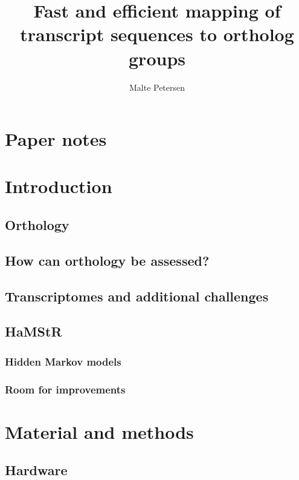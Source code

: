 \documentclass[a4paper,12.5pt]{scrreprt}
\title{Fast and efficient mapping of transcript sequences to ortholog groups}
\author{Malte Petersen}
\newcommand{\hamstr}{HaMStR\xspace}
\begin{document}
\maketitle
\tableofcontents

\chapter*{Paper notes}
	



\chapter{Introduction}
	
	\section{Orthology}
		
	\section{How can orthology be assessed?}
		
	\section{Transcriptomes and additional challenges}
		
	\section{\hamstr}
		
		\subsection{Hidden Markov models}
			
		\subsection{Room for improvements}

\chapter{Material and methods}
	\section{Hardware}
		
		
\end{document}
